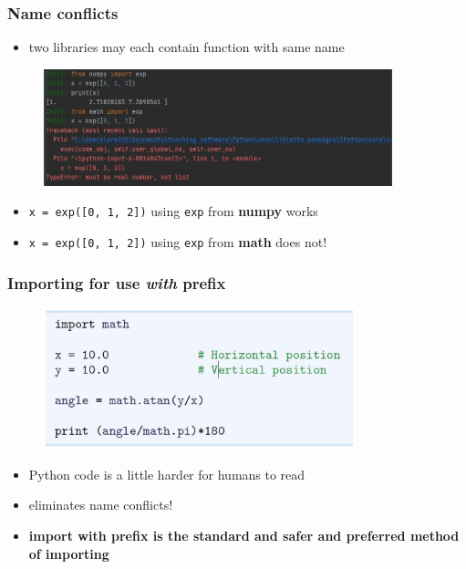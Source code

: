 \documentclass[14pt]{beamer}
\newcommand\red[1]{{\color{red} #1}}
\newcommand\green[1]{{\color{green} #1}}
\newcommand{\cmark}{\ding{51}}%
\newcommand{\xmark}{\ding{55}}%
\begin{document}

\begin{frame}[fragile]

\frametitle{Name conflicts}

\begin{itemize}
	\item two libraries may each contain function with same name
\end{itemize}

\begin{figure}[ht]
	\centering
	\includegraphics[width=0.9\textwidth]{figures/LLp16}
\end{figure}

{\small
\begin{itemize}
	\item[\green{\cmark}] \texttt{x = exp([0, 1, 2])} using \texttt{exp} from \textbf{numpy} works
	\item[\red{\xmark}] \texttt{x = exp([0, 1, 2])} using \texttt{exp} from \textbf{math} does not!
\end{itemize}
}
\end{frame}


\begin{frame}[fragile]

\frametitle{Importing for use \emph{with} prefix}

\begin{figure}[ht]
	\centering
	\includegraphics[width=0.8\textwidth]{figures/LLp14}
\end{figure}
\begin{itemize}
	\item[\red{\xmark}] Python code is a little harder for humans to read
	\item[\green{\cmark}\green{\cmark}] eliminates name conflicts!
	\item \textbf{import with prefix is the standard and safer and preferred method of importing}
\end{itemize}

\end{frame}
\end{document}
